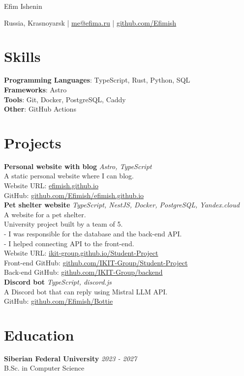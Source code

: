 \documentclass[a4paper, 12pt]{article}
\begin{document}
\centerline{\Huge Efim Ishenin}
\vspace{10pt}
\centerline{
  Russia, Krasnoyarsk |
  \href{mailto:me@efima.ru}{me@efima.ru} |
  \href{https://github.com/Efimish}{github.com/Efimish}
}

\section{Skills}
\textbf{Programming Languages}: TypeScript, Rust, Python, SQL \\
\textbf{Frameworks}: Astro \\
\textbf{Tools}: Git, Docker, PostgreSQL, Caddy \\
\textbf{Other}: GitHub Actions


\section{Projects}

\textbf{Personal website with blog} \hfill \textit{Astro, TypeScript} \\
A static personal website where I can blog. \\
Website URL: \href{https://efimish.github.io/}{efimish.github.io} \\
GitHub: \href{https://github.com/Efimish/efimish.github.io}{github.com/Efimish/efimish.github.io} \\

\textbf{Pet shelter website} \hfill \textit{TypeScript, NestJS, Docker, PostgreSQL, Yandex.cloud} \\
A website for a pet shelter. \\
University project built by a team of 5. \\
- I was responsible for the database and the back-end API. \\
- I helped connecting API to the front-end. \\
Website URL: \href{https://ikit-group.github.io/Student-Project/}{ikit-group.github.io/Student-Project} \\
Front-end GitHub: \href{https://github.com/IKIT-Group/Student-Project}{github.com/IKIT-Group/Student-Project} \\
Back-end GitHub: \href{https://github.com/IKIT-Group/backend}{github.com/IKIT-Group/backend} \\

\textbf{Discord bot} \hfill \textit{TypeScript, discord.js} \\
A Discord bot that can reply using Mistral LLM API. \\
GitHub: \href{https://github.com/Efimish/Bottie}{github.com/Efimish/Bottie} \\


\section{Education}
\textbf{Siberian Federal University}
\hfill \textit{2023 - 2027} \\
B.Sc. in Computer Science
\end{document}
